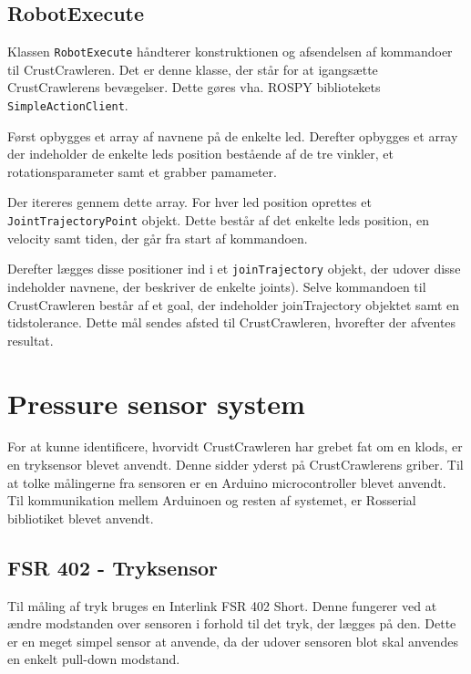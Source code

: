 \subsection{RobotExecute}
Klassen \texttt{RobotExecute} håndterer konstruktionen og afsendelsen af kommandoer til CrustCrawleren. Det er denne klasse, der står for at igangsætte CrustCrawlerens bevægelser. Dette gøres vha. ROSPY bibliotekets \texttt{SimpleActionClient}.

Først opbygges et array af navnene på de enkelte led. Derefter opbygges et array der indeholder de enkelte leds position bestående af de tre vinkler, et rotationsparameter samt et grabber pamameter.

	Der itereres gennem dette array. For hver led position oprettes et \texttt{JointTrajectoryPoint} objekt.  Dette består af det enkelte leds position, en velocity samt tiden, der går fra start af kommandoen.
	
Derefter lægges disse positioner ind i et \texttt{joinTrajectory} objekt, der udover disse indeholder navnene, der beskriver de enkelte joints).
Selve kommandoen til CrustCrawleren består af et goal, der indeholder joinTrajectory objektet samt en tidstolerance.
Dette mål sendes afsted til CrustCrawleren, hvorefter der afventes resultat. 

\section{Pressure sensor system}
For at kunne identificere, hvorvidt CrustCrawleren har grebet fat om en klods, er en tryksensor blevet anvendt. Denne sidder yderst på CrustCrawlerens griber. Til at tolke målingerne fra sensoren er en Arduino microcontroller blevet anvendt. Til kommunikation mellem Arduinoen og resten af systemet, er Rosserial bibliotiket blevet anvendt. 

\subsection{FSR 402 - Tryksensor}
Til måling af tryk bruges en Interlink FSR 402 Short. Denne fungerer ved at ændre modstanden over sensoren i forhold til det tryk, der lægges på den. Dette er en meget simpel sensor at anvende, da der udover sensoren blot skal anvendes en enkelt pull-down modstand. 


